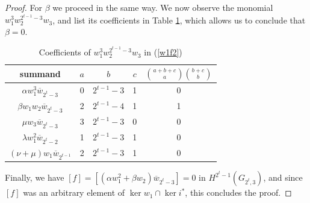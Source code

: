 \documentclass[10pt,a4paper]{amsart}
\begin{document}
\begin{proof}
For $\beta$ we proceed in the same way. We now observe the monomial $w_1^3w_2^{2^{t-1}-3}w_3$, and list its coefficients in Table \ref{tab:beta}, which allows us to conclude that $\beta =0$.
\begin{table}[h]
\renewcommand{\arraystretch}{1.5} %
\begin{tabular}{|c|c|c|c|c|}
 \hline
summand & $a$ & $b$ & $c$ &  $\binom{a+b+c}{a}\binom{b+c}{b}$ \\ [1ex]
 \hline
$\alpha w_1^3\overline w_{2^t-3}$ & 0 & $2^{t-1}-3$ & 1 &   0\\ 
$\beta w_1w_2\overline w_{2^t-3}$ & 2 & $2^{t-1}-4$ & 1 &   1\\
$\mu w_3\overline w_{2^t-3}$ & 3 & $2^{t-1}-3$ & 0 &   0\\
$\lambda w_1^2 \overline w_{2^t-2}$ & 1 & $2^{t-1}-3$ & 1 &   0\\
$(\nu + \mu)w_1\overline w_{2^{t-1}}$ & 2 & $2^{t-1}-3$ & 1 &   0\\
 \hline
  \end{tabular}
\caption{\label{tab:beta} Coefficients of $w_1^3w_2^{2^{t-1}-3}w_3$ in (\ref{w1f2})}
\end{table}

 Finally, we have $[f] = [(\alpha w_1^2 + \beta w_2)\overline w_{2^t-3}] = 0$ in $H^{2^t-1}(G_{2^t,3})$, and since $[f]$ was an arbitrary element of $\ker w_1\cap \ker i^*$, this concludes the proof.
\end{proof}
\end{document}
